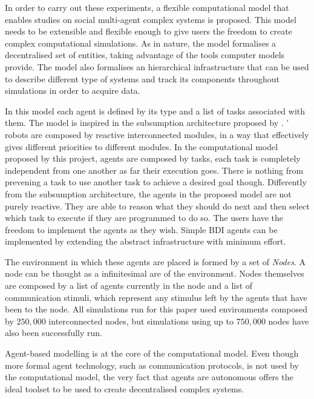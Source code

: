 In order to carry out these experiments, a flexible computational model that enables studies on social multi-agent complex systems is proposed. This model needs to be extensible and flexible enough to give users the freedom to create complex computational simulations. As in nature, the model formalises a decentralised set of entities, taking advantage of the tools computer models provide. The model also formalises an hierarchical infrastructure that can be used to describe different type of systems and track its components throughout simulations in order to acquire data.
 
In this model each agent is defined by its type and a list of tasks associated with them. The model is inspired in the subsumption architecture proposed by \citeauthor{1087032} \cite{1087032} \cite{Brooks1986b}. \citeauthor{1087032}' robots are composed by reactive interconnected modules, in a way that effectively gives different priorities to different modules. In the computational model proposed by this project, agents are composed by tasks, each task is completely independent from one another as far their execution goes. There is nothing from prevening a task to use another task to achieve a desired goal though. Differently from the subsumption architecture, the agents in the proposed model are not purely reactive. They are able to reason what they should do next and then select which task to execute if they are programmed to do so. The users have the freedom to implement the agents as they wish. Simple \ac{BDI} \cite{bratman1999intention} \cite{wooldridge2009introduction} agents can be implemented by extending the abstract infrastructure with minimum effort.

The environment in which these agents are placed is formed by a set of \emph{Nodes}. A node can be thought as a infinitesimal are of the environment. Nodes themselves are composed by a list of agents currently in the node and a list of communication stimuli, which represent any stimulus left by the agents that have been to the node. All simulations run for this paper used environments composed by $250,000$ interconnected nodes, but simulations using up to $750,000$ nodes have also been successfully run.

Agent-based modelling is at the core of the computational model. Even though more formal agent technology, such as communication protocols, is not used by the computational model, the very fact that agents are autonomous offers the ideal toolset to be used to create decentralised complex systems.

